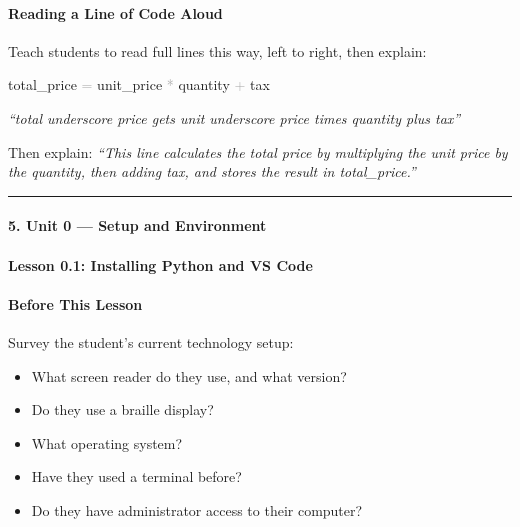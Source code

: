 \documentclass[
  justified,
  openright,
]{tufte-book}
\let\subsection\paragraph
\let\paragraph\paragraph
\newcommand{\OperatorTok}[1]{\textcolor{DarkGray}{#1}}              %
\newenvironment{Shaded}{%
  \begin{mdframed}[style=TufteCode]%
}{%
  \end{mdframed}%
}
\let\subsection\paragraph
\let\paragraph\paragraph
\providecommand{\tightlist}{%
  \setlength{\itemsep}{0pt}\setlength{\parskip}{0pt}}
\begin{document}
\subsection{Reading a Line of Code
Aloud}\label{reading-a-line-of-code-aloud}

Teach students to read full lines this way, left to right, then explain:

\begin{Shaded}
\begin{Highlighting}[]
total\_price \OperatorTok{=} unit\_price \OperatorTok{*} quantity \OperatorTok{+} tax
\end{Highlighting}
\end{Shaded}

\emph{``total underscore price gets unit underscore price times quantity
plus tax''}

Then explain: \emph{``This line calculates the total price by
multiplying the unit price by the quantity, then adding tax, and stores
the result in total\_price.''}



\begin{center}\rule{0.5\linewidth}{0.5pt}\end{center}

\subsection{5. Unit 0 --- Setup and
Environment}\label{unit-0-setup-and-environment}

\subsection{Lesson 0.1: Installing Python and VS
Code}\label{lesson-0.1-installing-python-and-vs-code}

\paragraph{Before This Lesson}\label{before-this-lesson}

Survey the student's current technology setup:

\begin{itemize}
\tightlist
\item
  What screen reader do they use, and what version?
\item
  Do they use a braille display?
\item
  What operating system?
\item
  Have they used a terminal before?
\item
  Do they have administrator access to their computer?
\end{itemize}
\end{document}
